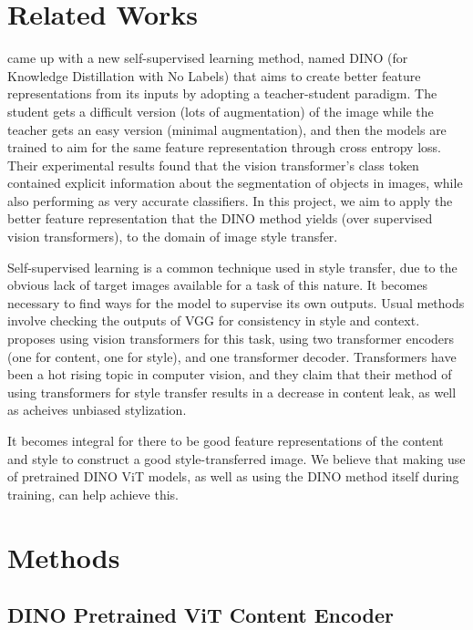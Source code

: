 \documentclass{article}
\begin{document}
\section{Related Works}

\cite{DINO} came up with a new self-supervised learning method, named DINO (for Knowledge Distillation with No Labels) that aims to create better feature representations from its inputs by adopting a teacher-student paradigm. The student gets a difficult version (lots of augmentation) of the image while the teacher gets an easy version (minimal augmentation), and then the models are trained to aim for the same feature representation through cross entropy loss. Their experimental results found that the vision transformer's class token contained explicit information about the segmentation of objects in images, while also performing as very accurate classifiers. In this project, we aim to apply the better feature representation that the DINO method yields (over supervised vision transformers), to the domain of image style transfer.

Self-supervised learning is a common technique used in style transfer, due to the obvious lack of target images available for a task of this nature. It becomes necessary to find ways for the model to supervise its own outputs. Usual methods \cite{CNNStyleTransfer} involve checking the outputs of VGG for consistency in style and context. \cite{ImageStyleTransformer} proposes using vision transformers for this task, using two transformer encoders (one for content, one for style), and one transformer decoder. Transformers have been a hot rising topic in computer vision, and they claim that their method of using transformers for style transfer results in a decrease in content leak, as well as acheives unbiased stylization.

It becomes integral for there to be good feature representations of the content and style to construct a good style-transferred image. We believe that making use of pretrained DINO ViT models, as well as using the DINO method itself during training, can help achieve this.

\section{Methods}

\subsection{DINO Pretrained ViT Content Encoder}
\end{document}
